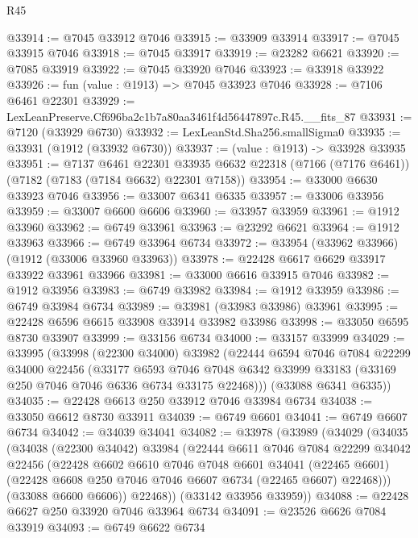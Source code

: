 \begin{lexlean}{R45}
\begin{coremodule}
{@33914 := @7045 @33912 @7046
@33915 := @33909 @33914
@33917 := @7045 @33915 @7046
@33918 := @7045 @33917
@33919 := @23282 @6621
@33920 := @7085 @33919
@33922 := @7045 @33920 @7046
@33923 := @33918 @33922
@33926 := fun (value : @1913) => @7045 @33923 @7046
@33928 := @7106 @6461 @22301
@33929 := LexLeanPreserve.Cf696ba2c1b7a80aa3461f4d56447897c.R45.__fits_87
@33931 := @7120 (@33929 @6730)
@33932 := LexLeanStd.Sha256.smallSigma0
@33935 := @33931 (@1912 (@33932 @6730))
@33937 := (value : @1913) -> @33928 @33935
@33951 := @7137
    @6461
    @22301
    @33935
    @6632
    @22318
    (@7166 (@7176 @6461))
    (@7182 (@7183 (@7184 @6632) @22301 @7158))
@33954 := @33000 @6630 @33923 @7046
@33956 := @33007 @6341 @6335
@33957 := @33006 @33956
@33959 := @33007 @6600 @6606
@33960 := @33957 @33959
@33961 := @1912 @33960
@33962 := @6749 @33961
@33963 := @23292 @6621
@33964 := @1912 @33963
@33966 := @6749 @33964 @6734
@33972 := @33954 (@33962 @33966) (@1912 (@33006 @33960 @33963))
@33978 := @22428 @6617 @6629 @33917 @33922 @33961 @33966
@33981 := @33000 @6616 @33915 @7046
@33982 := @1912 @33956
@33983 := @6749 @33982
@33984 := @1912 @33959
@33986 := @6749 @33984 @6734
@33989 := @33981 (@33983 @33986) @33961
@33995 := @22428 @6596 @6615 @33908 @33914 @33982 @33986
@33998 := @33050 @6595 @8730 @33907
@33999 := @33156 @6734
@34000 := @33157 @33999
@34029 := @33995
    (@33998
      (@22300 @34000)
      @33982
      (@22444
        @6594
        @7046
        @7084
        @22299
        @34000
        @22456
        (@33177
          @6593
          @7046
          @7048
          @6342
          @33999
          @33183
          (@33169 @250 @7046 @7046 @6336 @6734 @33175 @22468)))
      (@33088 @6341 @6335))
@34035 := @22428 @6613 @250 @33912 @7046 @33984 @6734
@34038 := @33050 @6612 @8730 @33911
@34039 := @6749 @6601
@34041 := @6749 @6607 @6734
@34042 := @34039 @34041
@34082 := @33978
    (@33989
      (@34029
        (@34035
          (@34038
            (@22300 @34042)
            @33984
            (@22444
              @6611
              @7046
              @7084
              @22299
              @34042
              @22456
              (@22428
                @6602
                @6610
                @7046
                @7048
                @6601
                @34041
                (@22465 @6601)
                (@22428 @6608 @250 @7046 @7046 @6607 @6734 (@22465 @6607) @22468)))
            (@33088 @6600 @6606))
          @22468))
      (@33142 @33956 @33959))
@34088 := @22428 @6627 @250 @33920 @7046 @33964 @6734
@34091 := @23526 @6626 @7084 @33919
@34093 := @6749 @6622 @6734
}
\end{coremodule}
\end{lexlean}
